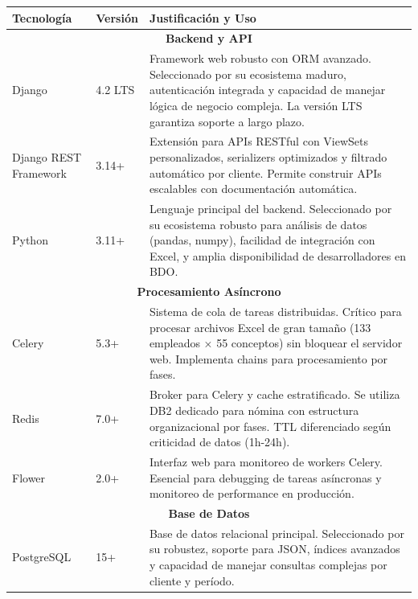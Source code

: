 \begin{longtable}{|p{3cm}|p{3cm}|p{7cm}|}
\hline
\textbf{Tecnología} & \textbf{Versión} & \textbf{Justificación y Uso} \\
\hline
\endhead

\multicolumn{3}{|c|}{\textbf{Backend y API}} \\
\hline

Django & 4.2 LTS & Framework web robusto con ORM avanzado. Seleccionado por su ecosistema maduro, autenticación integrada y capacidad de manejar lógica de negocio compleja. La versión LTS garantiza soporte a largo plazo. \\
\hline

Django REST Framework & 3.14+ & Extensión para APIs RESTful con ViewSets personalizados, serializers optimizados y filtrado automático por cliente. Permite construir APIs escalables con documentación automática. \\
\hline

Python & 3.11+ & Lenguaje principal del backend. Seleccionado por su ecosistema robusto para análisis de datos (pandas, numpy), facilidad de integración con Excel, y amplia disponibilidad de desarrolladores en BDO. \\
\hline

\multicolumn{3}{|c|}{\textbf{Procesamiento Asíncrono}} \\
\hline

Celery & 5.3+ & Sistema de cola de tareas distribuidas. Crítico para procesar archivos Excel de gran tamaño (133 empleados × 55 conceptos) sin bloquear el servidor web. Implementa chains para procesamiento por fases. \\
\hline

Redis & 7.0+ & Broker para Celery y cache estratificado. Se utiliza DB2 dedicado para nómina con estructura organizacional por fases. TTL diferenciado según criticidad de datos (1h-24h). \\
\hline

Flower & 2.0+ & Interfaz web para monitoreo de workers Celery. Esencial para debugging de tareas asíncronas y monitoreo de performance en producción. \\
\hline

\multicolumn{3}{|c|}{\textbf{Base de Datos}} \\
\hline

PostgreSQL & 15+ & Base de datos relacional principal. Seleccionado por su robustez, soporte para JSON, índices avanzados y capacidad de manejar consultas complejas por cliente y período. \\
\hline


\end{longtable}
